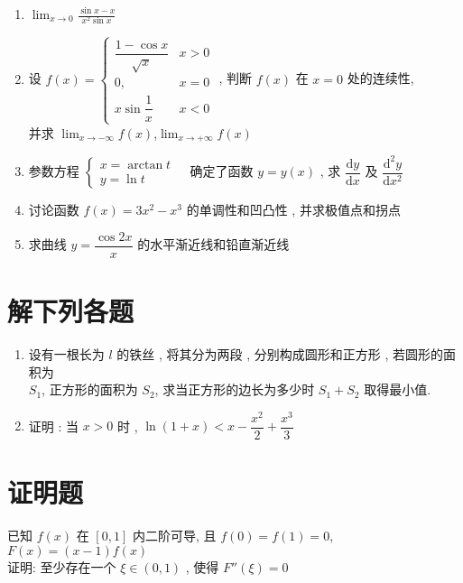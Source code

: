 \documentclass[twocolumn,UTF8]{ctexart}
\begin{document}
\begin{enumerate}
\item $\lim_{x\to0}\frac{\sin x-x}{x^2\sin x}$\\[5cm]
\item 设 $f(x)=\left\{\begin{array}{lc}\dfrac{1-\cos x}{\sqrt{x}}&x>0\\[1.8mm]
0,&x=0\\x\sin\dfrac{1}{x}&x< 0
\end{array}\right.$ , 判断 $f(x)$ 在 $x=0$ 处的连续性, \\[2mm]并求 $\lim_{x\to-\infty}f(x)$,$\lim_{x\to+\infty}f(x)$\\[7cm]
\item 参数方程 $ \begin{cases}x=\arctan t&\\y=\ln t&\end{cases} $ 确定了函数 $ y=y(x) $ , 求 $ \dfrac{\mathrm{d}y}{\mathrm{d}x} $ 及  $ \dfrac{\mathrm{d}^2y}{\mathrm{d}x^2} $
\end{enumerate}
\newpage\vspace*{4cm}\begin{enumerate}\setcounter{enumi}{3}
\item 讨论函数 $f(x)=3x^2-x^3$ 的单调性和凹凸性 , 并求极值点和拐点\\[7cm]
\item 求曲线 $y=\dfrac{\cos2x}{x}$ 的水平渐近线和铅直渐近线 \\[7cm]
\end{enumerate}
\newpage\section{解下列各题}
\begin{enumerate}
\item 设有一根长为 $l$ 的铁丝 , 将其分为两段 , 分别构成圆形和正方形 , 若圆形的面积为 \\$S_1$, 正方形的面积为 $S_2$, 求当正方形的边长为多少时  $S_1+S_2$  取得最小值.\\[7cm]
\item 证明 : 当 $x>0$ 时 , $\ln(1+x)<x-\dfrac{x^2}{2}+\dfrac{x^3}{3}$
\end{enumerate}
\newpage\section{证明题}
已知 $f(x)$  在 $[0,1]$ 内二阶可导, 且 $f(0)=f(1)=0$, $F(x)=(x-1)f(x)$\\
证明:  至少存在一个 $\xi\in(0,1)$ , 使得 $F''(\xi)=0$
\end{document}
